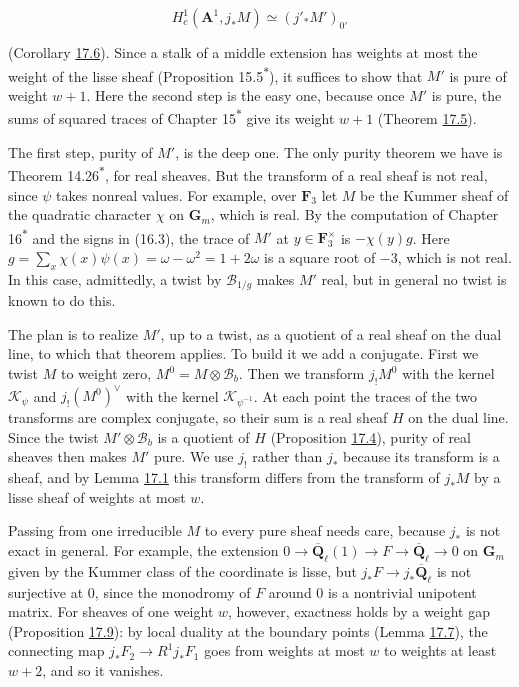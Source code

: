 \documentclass[11pt]{article}
\newcommand{\bpout}[1]{#1\textsuperscript{\hyperlink{bp-outside}{\ensuremath{\ast}}}}
\begin{document}
\[
H^1_c(\mathbf A^1,j_*M)\simeq(j'_*M')_{0'}
\]

(Corollary \hyperref[bp19]{17.6}). Since a stalk of a middle extension has weights at most the weight of the lisse sheaf (Proposition \bpout{15.5}), it suffices to show that \(M'\) is pure of weight \(w+1\). Here the second step is the easy one, because once \(M'\) is pure, the sums of squared traces of Chapter \bpout{15} give its weight \(w+1\) (Theorem \hyperref[bp16]{17.5}).

The first step, purity of \(M'\), is the deep one. The only purity theorem we have is Theorem \bpout{14.26}, for real sheaves. But the transform of a real sheaf is not real, since \(\psi\) takes nonreal values. For example, over \(\mathbf F_3\) let \(M\) be the Kummer sheaf of the quadratic character \(\chi\) on \(\mathbf G_m\), which is real. By the computation of Chapter \bpout{16} and the signs in (16.3), the trace of \(M'\) at \(y\in\mathbf F_3^\times\) is \(-\chi(y)g\). Here \(g=\sum_x\chi(x)\psi(x)=\omega-\omega^2=1+2\omega\) is a square root of \(-3\), which is not real. In this case, admittedly, a twist by \(\mathcal B_{1/g}\) makes \(M'\) real, but in general no twist is known to do this.

The plan is to realize \(M'\), up to a twist, as a quotient of a real sheaf on the dual line, to which that theorem applies. To build it we add a conjugate. First we twist \(M\) to weight zero, \(M^0=M\otimes\mathcal B_b\). Then we transform \(j_!M^0\) with the kernel \(\mathcal K_\psi\) and \(j_!(M^0)^\vee\) with the kernel \(\mathcal K_{\psi^{-1}}\). At each point the traces of the two transforms are complex conjugate, so their sum is a real sheaf \(H\) on the dual line. Since the twist \(M'\otimes\mathcal B_b\) is a quotient of \(H\) (Proposition \hyperref[bp12]{17.4}), purity of real sheaves then makes \(M'\) pure. We use \(j_!\) rather than \(j_*\) because its transform is a sheaf, and by Lemma \hyperref[bp5]{17.1} this transform differs from the transform of \(j_*M\) by a lisse sheaf of weights at most \(w\).

Passing from one irreducible \(M\) to every pure sheaf needs care, because \(j_*\) is not exact in general. For example, the extension \(0\to\overline{\mathbf Q}_\ell(1)\to F\to\overline{\mathbf Q}_\ell\to0\) on \(\mathbf G_m\) given by the Kummer class of the coordinate is lisse, but \(j_*F\to j_*\overline{\mathbf Q}_\ell\) is not surjective at \(0\), since the monodromy of \(F\) around \(0\) is a nontrivial unipotent matrix. For sheaves of one weight \(w\), however, exactness holds by a weight gap (Proposition \hyperref[bp27]{17.9}): by local duality at the boundary points (Lemma \hyperref[bp23]{17.7}), the connecting map \(j_*F_2\to R^1j_*F_1\) goes from weights at most \(w\) to weights at least \(w+2\), and so it vanishes.
\end{document}
